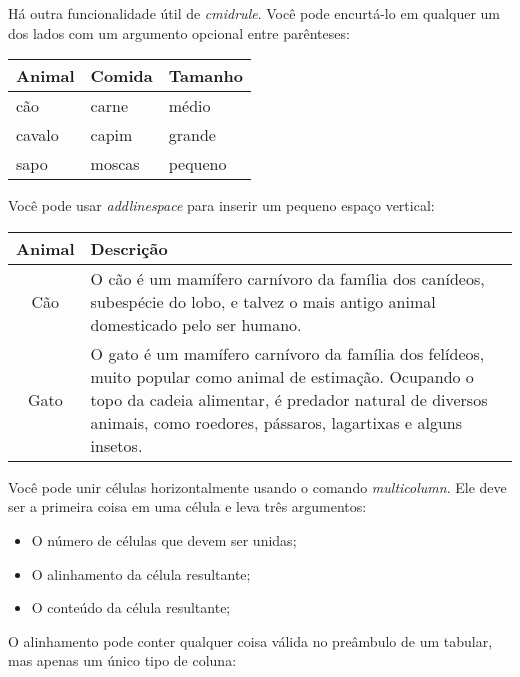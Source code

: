 \documentclass[brazilian]{article}
\begin{document}
Há outra funcionalidade útil de \emph{cmidrule}. Você pode encurtá-lo em qualquer um dos lados com um argumento opcional entre parênteses: \\

\begin{tabular}{*{3}{p{3cm}}}
    \toprule
    Animal & Comida & Tamanho \\
    \midrule
    cão    & carne  & médio   \\
    \cmidrule{1-2}
    cavalo & capim  & grande  \\
    \cmidrule(r){1-1}
    \cmidrule(rl){2-2}
    \cmidrule(l){3-3}
    sapo   & moscas & pequeno \\
    \bottomrule
\end{tabular}

\vspace{10pt}

Você pode usar \emph{addlinespace} para inserir um pequeno espaço vertical: \\

\begin{tabular}{cp{9cm}}
    \toprule
    Animal & Descrição \\
    \midrule
    Cão    & O cão é um mamífero carnívoro da família dos canídeos, subespécie do
             lobo, e talvez o mais antigo animal domesticado pelo ser humano. \\
    \addlinespace
    Gato   & O gato é um mamífero carnívoro da família dos felídeos, muito popular
             como animal de estimação. Ocupando o topo da cadeia alimentar, é
             predador natural de diversos animais, como roedores, pássaros,
             lagartixas e alguns insetos. \\
    \bottomrule
\end{tabular}

\vspace{10pt}

Você pode unir células horizontalmente usando o comando \emph{multicolumn}. Ele deve ser a primeira coisa em uma célula e leva três argumentos:

\begin{itemize}
    \item O número de células que devem ser unidas;
    \item O alinhamento da célula resultante;
    \item O conteúdo da célula resultante;
\end{itemize}

O alinhamento pode conter qualquer coisa válida no preâmbulo de um tabular, mas apenas um único tipo de coluna:
\end{document}
